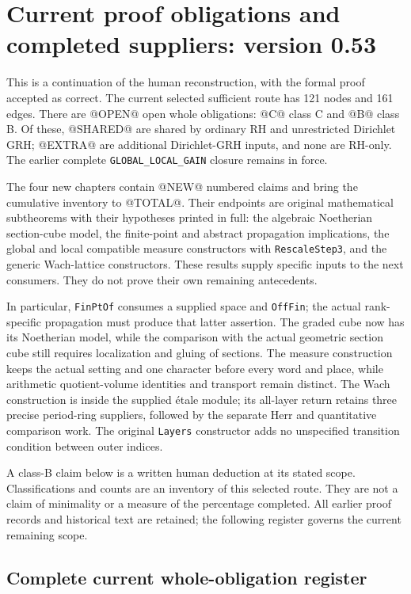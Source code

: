 \section{Current proof obligations and completed suppliers: version 0.53}
\label{sec:dependency-audit-v53}

This is a continuation of the human reconstruction, with the formal
proof accepted as correct. The current selected sufficient route has
121 nodes and 161 edges. There are @OPEN@ open whole obligations:
@C@ class C and @B@ class B. Of these, @SHARED@ are shared by ordinary
RH and unrestricted Dirichlet GRH; @EXTRA@ are additional Dirichlet-GRH
inputs, and none are RH-only. The earlier complete
\texttt{GLOBAL\_LOCAL\_GAIN} closure remains in force.

The four new chapters contain @NEW@ numbered claims and bring the
cumulative inventory to @TOTAL@. Their endpoints are original
mathematical subtheorems with their hypotheses printed in full:
the algebraic Noetherian section-cube model, the finite-point and
abstract propagation implications, the global and local compatible
measure constructors with \texttt{RescaleStep3}, and the generic
Wach-lattice constructors. These results supply specific inputs to
the next consumers. They do not prove their own remaining antecedents.

In particular, \texttt{FinPtOf} consumes a supplied space and
\texttt{OffFin}; the actual rank-specific propagation must produce
that latter assertion. The graded cube now has its Noetherian model,
while the comparison with the actual geometric section cube still
requires localization and gluing of sections. The measure construction
keeps the actual setting and one character before every word and
place, while arithmetic quotient-volume identities and transport
remain distinct. The Wach construction is inside the supplied
\'etale module; its all-layer return retains three precise period-ring
suppliers, followed by the separate Herr and quantitative comparison
work. The original \texttt{Layers} constructor adds no unspecified
transition condition between outer indices.

A class-B claim below is a written human deduction at its stated scope.
Classifications and counts are an inventory of this selected route.
They are not a claim of minimality or a measure of the percentage
completed. All earlier proof records and historical text are retained;
the following register governs the current remaining scope.

\subsection{Complete current whole-obligation register}


